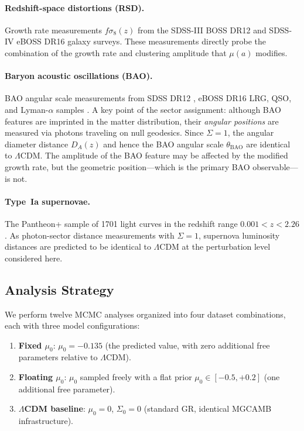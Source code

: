 \documentclass[11pt]{article}
\begin{document}
\paragraph{Redshift-space distortions (RSD).}
Growth rate measurements $f\sigma_8(z)$ from the SDSS-III BOSS DR12 \citep{Alam2017} and SDSS-IV eBOSS DR16 \citep{eBOSS2021} galaxy surveys.
These measurements directly probe the combination of the growth rate and clustering amplitude that $\mu(a)$ modifies.

\paragraph{Baryon acoustic oscillations (BAO).}
BAO angular scale measurements from SDSS DR12 \citep{Alam2017}, eBOSS DR16 LRG, QSO, and Lyman-$\alpha$ samples \citep{eBOSS2021}.
A key point of the sector assignment: although BAO features are imprinted in the matter distribution, their \emph{angular positions} are measured via photons traveling on null geodesics.
Since $\Sigma = 1$, the angular diameter distance $D_A(z)$ and hence the BAO angular scale $\theta_\mathrm{BAO}$ are identical to $\Lambda$CDM.
The amplitude of the BAO feature may be affected by the modified growth rate, but the geometric position---which is the primary BAO observable---is not.

\paragraph{Type~Ia supernovae.}
The Pantheon+ sample of 1701 light curves in the redshift range $0.001 < z < 2.26$ \citep{Pantheon}.
As photon-sector distance measurements with $\Sigma = 1$, supernova luminosity distances are predicted to be identical to $\Lambda$CDM at the perturbation level considered here.

\subsection{Analysis Strategy}

We perform twelve MCMC analyses organized into four dataset combinations, each with three model configurations:

\begin{enumerate}
\item \textbf{Fixed $\mu_0$}: $\mu_0 = -0.135$ (the predicted value, with zero additional free parameters relative to $\Lambda$CDM).
\item \textbf{Floating $\mu_0$}: $\mu_0$ sampled freely with a flat prior $\mu_0 \in [-0.5, +0.2]$ (one additional free parameter).
\item \textbf{$\Lambda$CDM baseline}: $\mu_0 = 0$, $\Sigma_0 = 0$ (standard GR, identical MGCAMB infrastructure).
\end{enumerate}
\end{document}
